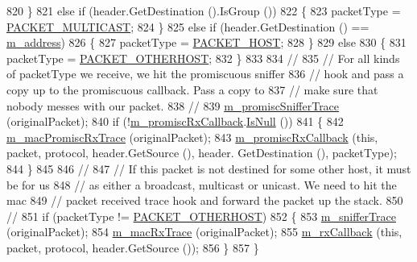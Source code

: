 \begin{DoxyCode}
820     \}
821   \textcolor{keywordflow}{else} \textcolor{keywordflow}{if} (header.GetDestination ().IsGroup ())
822     \{
823       packetType = \hyperlink{classns3_1_1NetDevice_ace65153f09144f55a0d3e702fc29d6b2ae3ffb88d364e97f06f662f5d7ba53bbe}{PACKET\_MULTICAST};
824     \}
825   \textcolor{keywordflow}{else} \textcolor{keywordflow}{if} (header.GetDestination () == \hyperlink{classns3_1_1CsmaNetDevice_ae26602a3eb4e97c0aa39ae61b4d028f8}{m\_address})
826     \{
827       packetType = \hyperlink{classns3_1_1NetDevice_ace65153f09144f55a0d3e702fc29d6b2a60835731aced24ac0c712ba61e62462e}{PACKET\_HOST};
828     \}
829   \textcolor{keywordflow}{else}
830     \{
831       packetType = \hyperlink{classns3_1_1NetDevice_ace65153f09144f55a0d3e702fc29d6b2a60c00fab4286dd2903e2b197a9f8c6c8}{PACKET\_OTHERHOST};
832     \}
833 
834   \textcolor{comment}{// }
835   \textcolor{comment}{// For all kinds of packetType we receive, we hit the promiscuous sniffer}
836   \textcolor{comment}{// hook and pass a copy up to the promiscuous callback.  Pass a copy to }
837   \textcolor{comment}{// make sure that nobody messes with our packet.}
838   \textcolor{comment}{//}
839   \hyperlink{classns3_1_1CsmaNetDevice_aae7fbd28077e7ac8efee738c4194ed16}{m\_promiscSnifferTrace} (originalPacket);
840   \textcolor{keywordflow}{if} (!\hyperlink{classns3_1_1CsmaNetDevice_a4c9c0533341d76fe278fbef18525b228}{m\_promiscRxCallback}.\hyperlink{classns3_1_1Callback_aa8e27826badbf37f84763f36f70d9b54}{IsNull} ())
841     \{
842       \hyperlink{classns3_1_1CsmaNetDevice_a4b22f431d8511abaf9ef4e92cc41ce24}{m\_macPromiscRxTrace} (originalPacket);
843       \hyperlink{classns3_1_1CsmaNetDevice_a4c9c0533341d76fe278fbef18525b228}{m\_promiscRxCallback} (\textcolor{keyword}{this}, packet, protocol, header.GetSource (), header.
      GetDestination (), packetType);
844     \}
845 
846   \textcolor{comment}{//}
847   \textcolor{comment}{// If this packet is not destined for some other host, it must be for us}
848   \textcolor{comment}{// as either a broadcast, multicast or unicast.  We need to hit the mac}
849   \textcolor{comment}{// packet received trace hook and forward the packet up the stack.}
850   \textcolor{comment}{//}
851   \textcolor{keywordflow}{if} (packetType != \hyperlink{classns3_1_1NetDevice_ace65153f09144f55a0d3e702fc29d6b2a60c00fab4286dd2903e2b197a9f8c6c8}{PACKET\_OTHERHOST})
852     \{
853       \hyperlink{classns3_1_1CsmaNetDevice_a88e5994b762e01f74606742a7f15b797}{m\_snifferTrace} (originalPacket);
854       \hyperlink{classns3_1_1CsmaNetDevice_a40f2a9fcb15d1e44fc918d1639bff18a}{m\_macRxTrace} (originalPacket);
855       \hyperlink{classns3_1_1CsmaNetDevice_a18646390c167ad8f0f8b8795a9052031}{m\_rxCallback} (\textcolor{keyword}{this}, packet, protocol, header.GetSource ());
856     \}
857 \}
\end{DoxyCode}


